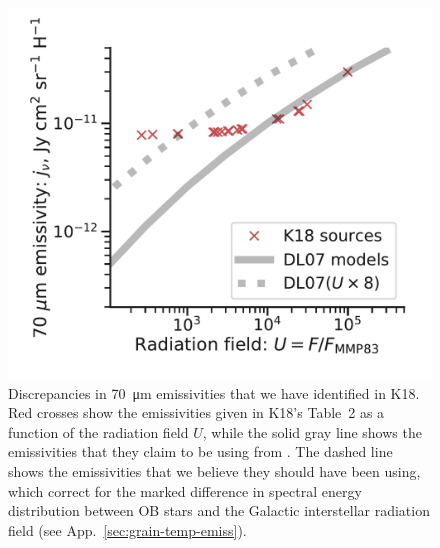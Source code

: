 

\begin{figure}
  \centering
  \includegraphics[width=\linewidth]{figs/K18-emissivity-vs-U}
  \caption{Discrepancies in \SI{70}{\um} emissivities that we have
    identified in K18.  Red crosses show the emissivities given in
    K18's Table~2 as a function of the radiation field \(U\), while
    the solid gray line shows the emissivities that they claim to be
    using from \citet{Draine:2007a}.  The dashed line shows the
    emissivities that we believe they should have been using, which
    correct for the marked difference in spectral energy distribution
    between OB stars and the Galactic interstellar radiation field
    (see App.~\ref{sec:grain-temp-emiss}).}
  \label{fig:k18-emissivity}
\end{figure}

